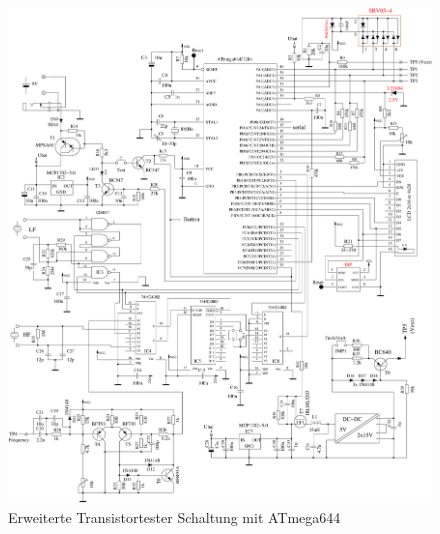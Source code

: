 \begin{figure}[H]
\centering
\includegraphics[width=1.\textwidth]{../FIG/t644tester.pdf}	%
\caption{Erweiterte Transistortester Schaltung mit ATmega644}
\label{fig:t644tester}
\end{figure}

